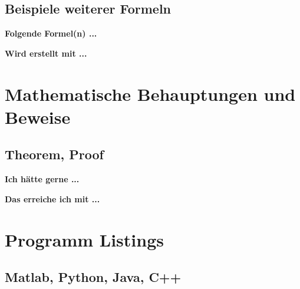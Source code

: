 \documentclass[twoside, 
               a4paper, 
               10pt, 
               parskip=full, 
               sectionentrydots=true, 
               listof=totoc, 
               listof=entryprefix,
               numbers=endperiod]{scrartcl}
\begin{document}
\newpage
\subsection{Beispiele weiterer Formeln}
{\textbf {Folgende Formel(n) ...}}
\begin{miniSeite}[colbacktitle=black!35!white,title=Ausdruck]

\end{miniSeite}

\newpage
{\textbf {Wird erstellt mit ...}}
\begin{miniSeite}[colbacktitle=black!35!white,title=\LaTeX-Code]

\end{miniSeite}



\newpage
\section{Mathematische Behauptungen und Beweise}
\subsection{Theorem, Proof}

{\textbf {Ich hätte gerne ...}}
 
\begin{miniSeite}[colbacktitle=black!35!white,title=Ausdruck]

\end{miniSeite}


\newpage
{\textbf {Das erreiche ich mit ...}}
 
\begin{miniSeite}[colbacktitle=black!35!white,title=\LaTeX-Code]

\end{miniSeite}





\newpage
\section{Programm Listings}
\subsection{Matlab, Python, Java, C++}
\end{document}
